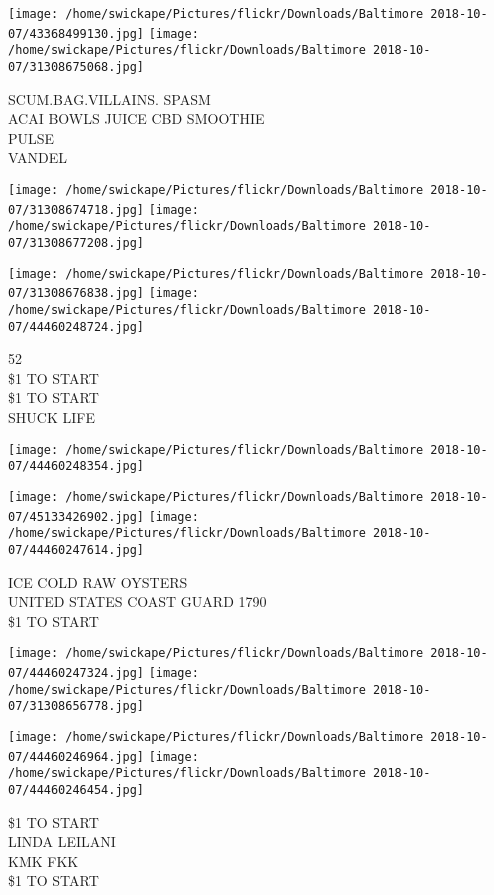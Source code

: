\documentclass[10pt,letterpaper]{article}
\begin{document}
\texttt{[image: /home/swickape/Pictures/flickr/Downloads/Baltimore 2018-10-07/43368499130.jpg]}
\texttt{[image: /home/swickape/Pictures/flickr/Downloads/Baltimore 2018-10-07/31308675068.jpg]}

SCUM.BAG.VILLAINS. SPASM\\
ACAI BOWLS JUICE CBD SMOOTHIE\\
PULSE\\
VANDEL\\
\pagebreak

\texttt{[image: /home/swickape/Pictures/flickr/Downloads/Baltimore 2018-10-07/31308674718.jpg]}
\texttt{[image: /home/swickape/Pictures/flickr/Downloads/Baltimore 2018-10-07/31308677208.jpg]}

\texttt{[image: /home/swickape/Pictures/flickr/Downloads/Baltimore 2018-10-07/31308676838.jpg]}
\texttt{[image: /home/swickape/Pictures/flickr/Downloads/Baltimore 2018-10-07/44460248724.jpg]}

52\\
\$1 TO START\\
\$1 TO START\\
SHUCK LIFE\\
\pagebreak

\texttt{[image: /home/swickape/Pictures/flickr/Downloads/Baltimore 2018-10-07/44460248354.jpg]}

\vspace{0.25in}
\texttt{[image: /home/swickape/Pictures/flickr/Downloads/Baltimore 2018-10-07/45133426902.jpg]}
\texttt{[image: /home/swickape/Pictures/flickr/Downloads/Baltimore 2018-10-07/44460247614.jpg]}

ICE COLD RAW OYSTERS\\
UNITED STATES COAST GUARD 1790\\
\$1 TO START\\
\pagebreak

\texttt{[image: /home/swickape/Pictures/flickr/Downloads/Baltimore 2018-10-07/44460247324.jpg]}
\texttt{[image: /home/swickape/Pictures/flickr/Downloads/Baltimore 2018-10-07/31308656778.jpg]}

\texttt{[image: /home/swickape/Pictures/flickr/Downloads/Baltimore 2018-10-07/44460246964.jpg]}
\texttt{[image: /home/swickape/Pictures/flickr/Downloads/Baltimore 2018-10-07/44460246454.jpg]}

\$1 TO START\\
LINDA LEILANI\\
KMK FKK\\
\$1 TO START\\
\pagebreak
\end{document}
